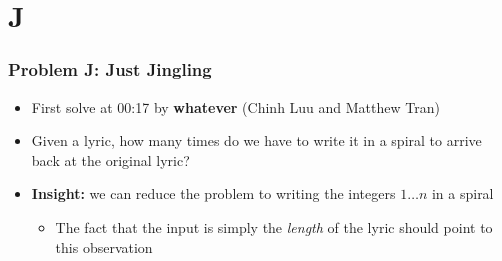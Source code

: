 \section{J}%
 \setcounter{MaxMatrixCols}{20}
\label{sec:j}

\begin{frame}
  \frametitle{Problem J: Just Jingling}

  \begin{itemize}
    \item First solve at 00:17 by \textbf{whatever} (Chinh Luu and Matthew Tran)
    \item Given a lyric, how many times do we have to write it in a spiral to arrive back at the original lyric?
    \item \textbf{Insight:} we can reduce the problem to writing the integers $1\dots n$ in a spiral
      \begin{itemize}
        \item The fact that the input is simply the \textit{length} of the lyric should point to this observation
      \end{itemize}
  \end{itemize}
\end{frame}

